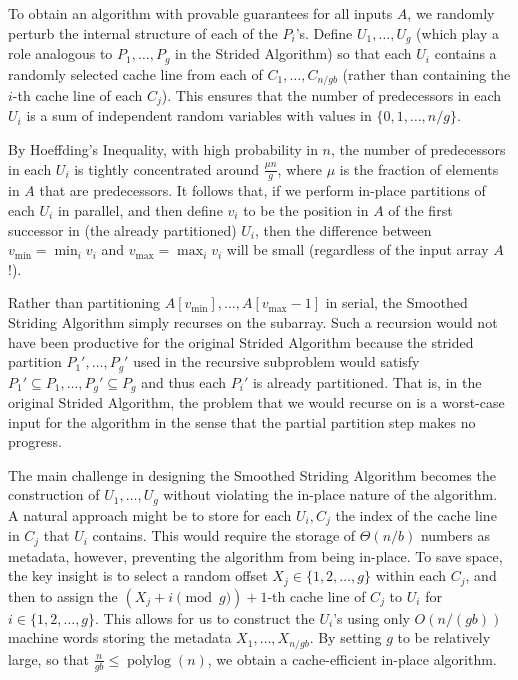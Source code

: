 \documentclass[sigconf]{acmart}
\renewcommand{\paragraph}[1]{\vspace{0.09in}\noindent{\bf \boldmath #1.}}
\theoremstyle{remark}
\theoremstyle{remark}
\begin{document}
\paragraph{The Smoothed Striding Algorithm}
To obtain an algorithm with provable guarantees for all inputs $A$, we
randomly perturb the internal structure of each of the $P_i$'s. Define
$U_1, \ldots, U_{g}$ (which play a role analogous to $P_1,
\ldots, P_g$ in the Strided Algorithm) so that each $U_i$ contains a
randomly selected cache line from each of $C_1, \ldots, C_{n /
  gb}$ (rather than containing the $i$-th cache line of each
$C_j$). This ensures that the number of predecessors in each $U_i$ is
a sum of independent random variables with values in $\{0, 1, \ldots,
n/g\}$.

By Hoeffding's Inequality, with high probability in $n$, the number of
predecessors in each $U_i$ is tightly concentrated around $\frac{\mu
  n}{g}$, where $\mu$ is the fraction of elements in $A$ that are
predecessors. It follows that, if we perform in-place partitions of
each $U_i$ in parallel, and then define $v_i$ to be the position in
$A$ of the first successor in (the already partitioned) $U_i$, then
the difference between $v_{\text{min}} = \min_i v_i$ and
$v_{\text{max}} = \max_i v_i$ will be small (regardless of the input array
$A$!).

Rather than partitioning $A[v_{\text{min}}],\ldots,
A[v_{\text{max}}-1]$ in serial, the Smoothed Striding Algorithm simply
recurses on the subarray. Such a recursion would not have been
productive for the original Strided Algorithm because the strided
partition $P_1', \ldots, P_g'$ used in the recursive subproblem would
satisfy $P_1' \subseteq P_1, \ldots, P_g' \subseteq P_g$ and thus each
$P_i'$ is already partitioned. That is, in the original Strided
Algorithm, the problem that we would recurse on is a worst-case input
for the algorithm in the sense that the partial partition step makes
no progress.


The main challenge in designing the Smoothed Striding Algorithm
becomes the construction of $U_1, \ldots, U_{g}$ without
violating the in-place nature of the algorithm. A natural approach
might be to store for each $U_i, C_j$ the index of the cache
line in $C_j$ that $U_i$ contains. This would require the storage of
$\Theta(n / b)$ numbers as metadata, however, preventing the algorithm
from being in-place. To save space, the key insight is to select a
random offset $X_j \in \{1, 2, \ldots, g\}$ within each $C_j$, and
then to assign the $(X_j + i \pmod g) + 1$-th cache line of $C_j$ to
$U_i$ for $i \in \{1, 2, \ldots, g\}$. This allows for us to construct
the $U_i$'s using only $O(n/(gb))$ machine words
storing the metadata $X_1, \ldots, X_{n / gb}$. By setting $g$ to
be relatively large, so that $\frac{n}{gb} \le
\operatorname{polylog}(n)$, we obtain a cache-efficient in-place algorithm.
\end{document}
